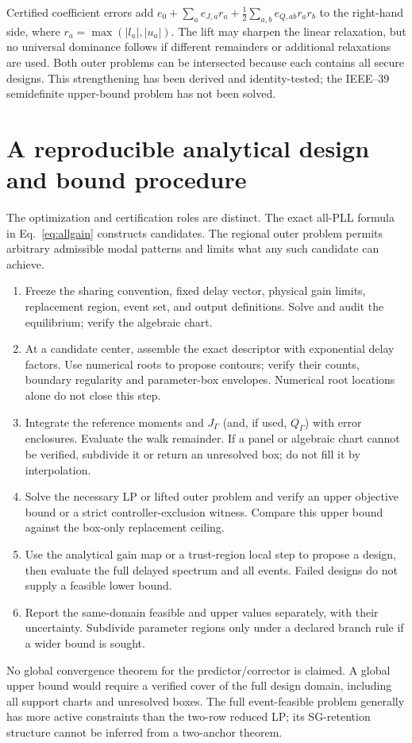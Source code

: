 \documentclass[11pt]{article}
\begin{document}
Certified coefficient errors add
$e_0+\sum_a e_{J,a}r_a+
\tfrac12\sum_{a,b}e_{Q,ab}r_ar_b$ to the right-hand side,
where $r_a=\max(|l_a|,|u_a|)$. The lift may sharpen the linear
relaxation, but no universal dominance follows if different
remainders or additional relaxations are used. Both outer problems
can be intersected because each contains all secure designs.
This strengthening has been derived and identity-tested; the
IEEE--39 semidefinite upper-bound problem has not been solved.

\section{A reproducible analytical design and bound procedure}
\label{sec:algorithm}
The optimization and certification roles are distinct. The exact
all-PLL formula in Eq.~\eqref{eq:allgain} constructs candidates.
The regional outer problem permits arbitrary admissible modal
patterns and limits what any such candidate can achieve.

\begin{enumerate}
\item Freeze the sharing convention, fixed delay vector, physical
gain limits, replacement region, event set, and output definitions.
Solve and audit the equilibrium; verify the algebraic chart.
\item At a candidate center, assemble the exact descriptor with
exponential delay factors. Use numerical roots to propose contours;
verify their counts, boundary regularity and parameter-box envelopes.
Numerical root locations alone do not close this step.
\item Integrate the reference moments and $J_\Gamma$ (and, if used,
$Q_\Gamma$) with error enclosures. Evaluate the walk remainder.
If a panel or algebraic chart cannot be verified, subdivide it or
return an unresolved box; do not fill it by interpolation.
\item Solve the necessary LP or lifted outer problem and verify an
upper objective bound or a strict controller-exclusion witness.
Compare this upper bound against the box-only replacement ceiling.
\item Use the analytical gain map or a trust-region local step to
propose a design, then evaluate the full delayed spectrum and all
events. Failed designs do not supply a feasible lower bound.
\item Report the same-domain feasible and upper values separately,
with their uncertainty. Subdivide parameter regions only under a
declared branch rule if a wider bound is sought.
\end{enumerate}
No global convergence theorem for the predictor/corrector is claimed.
A global upper bound would require a verified cover of the full
design domain, including all support charts and unresolved boxes.
The full event-feasible problem generally has more active constraints
than the two-row reduced LP; its SG-retention structure cannot be
inferred from a two-anchor theorem.
\end{document}
